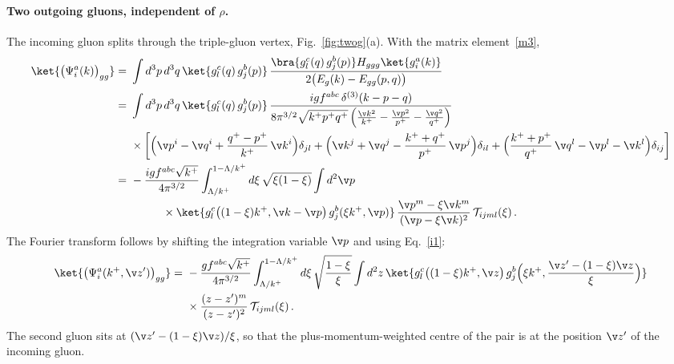 \paragraph{Two outgoing gluons, independent of $\rho$.}
The incoming gluon splits through the triple-gluon vertex, Fig.~\ref{fig:twog}(a). With the matrix
element~\eqref{m3},
\begin{align}\label{rhoindep}
\ket{\big(\Psi^{a}_{i}(k)\big)_{gg}}
=\ &\int d^{3}p\,d^{3}q\,\ket{g^{c}_{l}(q)\,g^{b}_{j}(p)}\,
\frac{\bra{g^{c}_{l}(q)\,g^{b}_{j}(p)}H_{ggg}\ket{g^{a}_{i}(k)}}{2\big(E_{g}(k)-E_{gg}(p,q)\big)}\notag\\
=\ &\int d^{3}p\,d^{3}q\,\ket{g^{c}_{l}(q)\,g^{b}_{j}(p)}\,
\frac{igf^{abc}\,\delta^{(3)}(k-p-q)}{8\pi^{3/2}\sqrt{k^{+}p^{+}q^{+}}\,
\Big(\frac{\v k^{2}}{k^{+}}-\frac{\v p^{2}}{p^{+}}-\frac{\v q^{2}}{q^{+}}\Big)}\notag\\
&\times\bigg[\Big(\v p^{i}-\v q^{i}+\frac{q^{+}-p^{+}}{k^{+}}\,\v k^{i}\Big)\delta_{jl}
+\Big(\v k^{j}+\v q^{j}-\frac{k^{+}+q^{+}}{p^{+}}\,\v p^{j}\Big)\delta_{il}
+\Big(\frac{k^{+}+p^{+}}{q^{+}}\,\v q^{l}-\v p^{l}-\v k^{l}\Big)\delta_{ij}\bigg]\notag\\
=\ &-\frac{igf^{abc}\sqrt{k^{+}}}{4\pi^{3/2}}\int_{\Lambda/k^{+}}^{1-\Lambda/k^{+}}d\xi\,\sqrt{\xi(1-\xi)}\int d^{2}\v p\notag\\
&\hspace{1cm}\times\ket{g^{c}_{l}\big((1-\xi)k^{+},\v k-\v p\big)\,g^{b}_{j}(\xi k^{+},\v p)}\,
\frac{\v p^{m}-\xi\v k^{m}}{(\v p-\xi\v k)^{2}}\,\mathcal{T}_{ijml}(\xi)\,.
\end{align}
The Fourier transform follows by shifting the integration variable $\v p$ and using Eq.~\eqref{i1}:
\begin{align}\label{gindeppos}
\ket{\big(\Psi^{a}_{i}(k^{+},\v z')\big)_{gg}}
=\ &-\frac{gf^{abc}\sqrt{k^{+}}}{4\pi^{3/2}}\int_{\Lambda/k^{+}}^{1-\Lambda/k^{+}}d\xi\,\sqrt{\frac{1-\xi}{\xi}}\int d^{2}z\,
\ket{g^{c}_{l}\big((1-\xi)k^{+},\v z\big)\,g^{b}_{j}\Big(\xi k^{+},\frac{\v z'-(1-\xi)\v z}{\xi}\Big)}\notag\\
&\times\frac{(z-z')^{m}}{(z-z')^{2}}\,\mathcal{T}_{ijml}(\xi)\,.
\end{align}
The second gluon sits at $(\v z'-(1-\xi)\v z)/\xi$, so that the plus-momentum-weighted centre of the pair
is at the position $\v z'$ of the incoming gluon.

